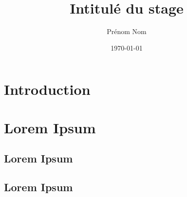 \documentclass[utf8]{stageM2R} %
\author{Prénom Nom}
\title{Intitulé du stage}
\date{\today}
\begin{document}
   
\frontmatter  %
\maketitle    %
\cleardoublepage   
\tableofcontents %
\mainmatter  %



\chapter{Introduction}
\lipsum
\chapter{Lorem Ipsum}
\lipsum
\section{Lorem Ipsum} 
\lipsum
\section{Lorem Ipsum} 
\lipsum    
\end{document}

